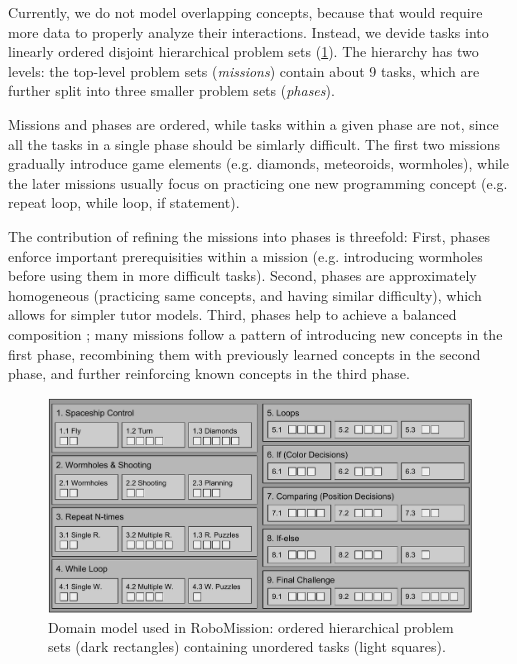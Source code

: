 Currently, we do not model overlapping concepts, because that would require
more data to properly analyze their interactions.
Instead, we devide tasks into linearly ordered disjoint hierarchical problem
sets (\cref{fig:robomission.domain}). %
The hierarchy has two levels: the top-level problem sets (\emph{missions})
contain about 9 tasks, which are further split into three smaller
problem sets (\emph{phases}).

Missions and phases are ordered, while tasks within a given phase are not,
since all the tasks in a single phase should be simlarly difficult.
The first two missions gradually introduce game elements
(e.g. diamonds, meteoroids, wormholes),
while the later missions usually focus on practicing one new programming
concept (e.g. repeat loop, while loop, if statement).

The contribution of refining the missions into phases is threefold:
First, phases enforce important prerequisities within a mission (e.g.
introducing wormholes before using them in more difficult tasks).
Second, phases are approximately homogeneous (practicing same concepts, and having similar difficulty),
which allows for simpler tutor models.
Third, phases help to achieve a balanced composition \cite{progression-analysis};
  many missions follow a pattern of
  introducing new concepts in the first phase,
  recombining them with previously learned concepts in the second phase,
  and further reinforcing known concepts in the third phase. %

\begin{figure}[htb]
\centering
\includegraphics[width=\textwidth]{img/robomission-domain}
\caption{%
  Domain model used in RoboMission: ordered hierarchical problem sets (dark rectangles)
  containing unordered tasks (light squares).}
\label{fig:robomission.domain}
\end{figure}




